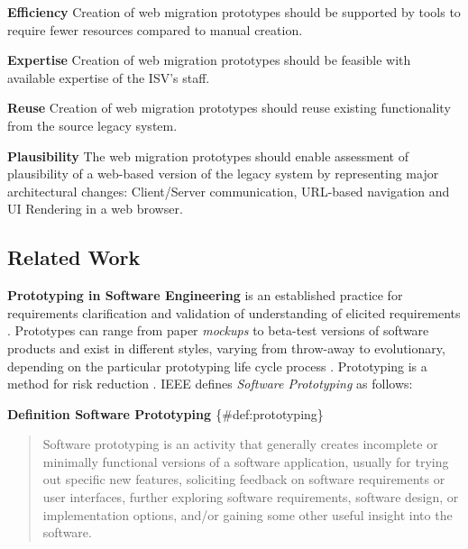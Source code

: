 \textbf{Efficiency} Creation of web migration prototypes should be supported by tools to require fewer resources compared to manual creation.

\textbf{Expertise} Creation of web migration prototypes should be feasible with available expertise of the ISV's staff.

\textbf{Reuse} Creation of web migration prototypes should reuse existing functionality from the source legacy system.

\textbf{Plausibility} The web migration prototypes should enable assessment of plausibility of a web-based version of the legacy system by representing major architectural changes: Client/Server communication, URL-based navigation and UI Rendering in a web browser.

\hypertarget{sec:awsm-rm:related-work}{%
\subsection{Related Work}\label{sec:awsm-rm:related-work}}

\textbf{Prototyping in Software Engineering} is an established practice for requirements clarification and validation of understanding of elicited requirements \autocite{SWEBOK2014,Wood1992Prototyping}.
Prototypes can range from paper \emph{mockups} \autocite{ISO/IEEE24765Vocabulary} to beta-test versions of software products and exist in different styles, varying from throw-away to evolutionary, depending on the particular prototyping life cycle process \autocite{SWEBOK2014}.
Prototyping is a method for risk reduction \autocite{ISO/IEEE24765Vocabulary}.
IEEE defines \emph{Software Prototyping} as follows:

\textbf{Definition Software Prototyping \autocite{SWEBOK2014}} \{\#def:prototyping\}

\begin{quote}
Software prototyping is an activity that generally creates incomplete or minimally functional versions of a software application, usually for trying out specific new features, soliciting feedback on software requirements or user interfaces, further exploring software requirements, software design, or implementation options, and/or gaining some other useful insight into the software.
\end{quote}

